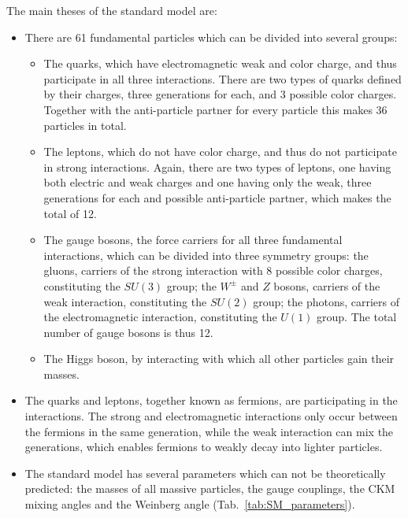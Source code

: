 The main theses of the standard model are:
\begin{itemize}
\item There are 61 fundamental particles which can be divided into several groups:
\begin{itemize}
\item The quarks, which have electromagnetic weak and color charge, and thus participate in all three interactions. There are two types of quarks defined by their charges, three generations for each, and 3 possible color charges. Together with the anti-particle partner for every particle this makes 36 particles in total.
\item The leptons, which do not have color charge, and thus do not participate in strong interactions. Again, there are two types of leptons, one having both electric and weak charges and one having only the weak, three generations for each and possible anti-particle partner, which makes the total of 12.
\item The gauge bosons, the force carriers for all three fundamental interactions, which can be divided into three symmetry groups: the gluons, carriers of the strong interaction with 8 possible color charges, constituting the $SU(3)$ group; the $W^{\pm}$ and $Z$ bosons, carriers of the weak interaction, constituting the $SU(2)$ group; the photons, carriers of the electromagnetic interaction, constituting the $U(1)$ group. The total number of gauge bosons is thus 12.
\item The Higgs boson, by interacting with which all other particles gain their masses.
\end{itemize}
\item The quarks and leptons, together known as fermions, are participating in the interactions. The strong and electromagnetic interactions only occur between the fermions in the same generation, while the weak interaction can mix the generations, which enables fermions to weakly decay into lighter particles.
\item The standard model has several parameters which can not be theoretically predicted: the masses of all massive particles, the gauge couplings, the CKM mixing angles and the Weinberg angle (Tab.~\ref{tab:SM_parameters}).
\end{itemize}


